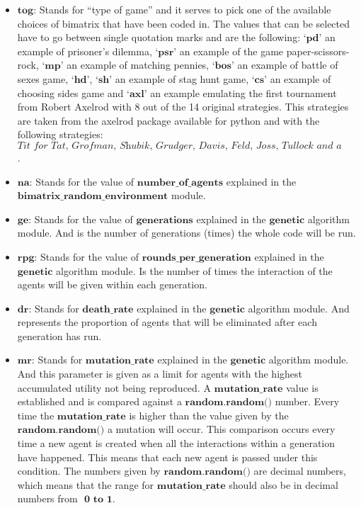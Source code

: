 \documentclass{article}
\begin{document}
\begin{itemize}
	\item $\textbf{tog:}$ Stands for ``type of game'' and it serves to pick one of the available choices of bimatrix that have been coded in. The values that can be selected have to go between single quotation marks and are the following: $\textbf{`pd'}$ an example of prisoner's dilemma, $\textbf{`psr'}$ an example of the game paper-scissors-rock, $\textbf{`mp'}$ an example of matching pennies, $\textbf{`bos'}$ an example of battle of sexes game, $\textbf{`hd'}$, $\textbf{`sh'}$ an example of stag hunt game, $\textbf{`cs'}$ an example of choosing sides game and $\textbf{`axl'}$ an example emulating the first tournament from Robert Axelrod with 8 out of the 14 original strategies. This strategies are taken from the axelrod package available for python and with the following strategies: $\textit{Tit for Tat, Grofman, Shubik, Grudger, Davis, Feld, Joss, Tullock and a Random strategy}$.
	\item$\textbf{na:}$ Stands for the value of $\textbf{number\_of\_agents}$ explained in the $\textbf{bimatrix\_random\_environment}$ module.
	\item $\textbf{ge:}$ Stands for the value of $\textbf{generations}$ explained in the $\textbf{genetic}$ algorithm module. And is the number of generations (times) the whole code will be run.
	\item $\textbf{rpg:}$ Stands for the value of $\textbf{rounds\_per\_generation}$ explained in the $\textbf{genetic}$  algorithm module. Is the number of times the interaction of the agents will be given within each generation. 
	\item $\textbf{dr:}$ Stands for $\textbf{death\_rate}$ explained in the $\textbf{genetic}$ algorithm module. And represents the proportion of agents that will be eliminated after each generation has run.
	\item $\textbf{mr:}$ Stands for $\textbf{mutation\_rate}$ explained in the $\textbf{genetic}$ algorithm module. And this parameter is given as a limit for agents with the highest accumulated utility not being reproduced. A $\textbf{mutation\_rate}$ value is established and is compared against a $\textbf{random.random()}$ number. Every time the $\textbf{mutation\_rate}$ is higher than the value given by the $\textbf{random.random()}$ a mutation will occur. This comparison occurs every time a new agent is created when all the interactions within a generation have happened. This means that each new agent is passed under this condition. The numbers given by $\textbf{random.random()}$ are decimal numbers, which means that the range for $\textbf{mutation\_rate}$ should also be in decimal numbers from $\textbf{ 0 to 1}$.

\end{itemize}
\end{document}
